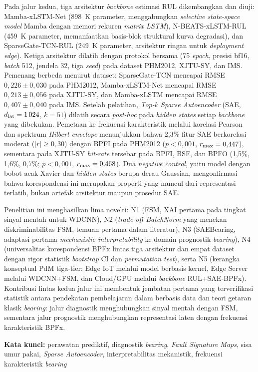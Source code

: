 \begin{abstractid}
Pada jalur kedua, tiga arsitektur \emph{backbone} estimasi RUL
dikembangkan dan diuji: Mamba-xLSTM-Net (898~K parameter, menggabungkan
\emph{selective state-space model} Mamba dengan memori rekuren
\emph{matrix LSTM}), N-BEATS-xLSTM-RUL (459~K parameter, memanfaatkan
basis-blok struktural kurva degradasi), dan SparseGate-TCN-RUL (249~K
parameter, arsitektur ringan untuk \emph{deployment edge}).
Ketiga arsitektur dilatih dengan protokol bersama (75 \emph{epoch},
presisi bf16, \emph{batch} 512, jendela 32, tiga \emph{seed}) pada
dataset PHM2012, XJTU-SY, dan IMS.
Pemenang berbeda menurut dataset: SparseGate-TCN mencapai RMSE
$0{,}226 \pm 0{,}030$ pada PHM2012, {\color{blue}Mamba-xLSTM-Net mencapai RMSE
$0{,}213 \pm 0{,}056$ pada XJTU-SY}, dan Mamba-xLSTM mencapai RMSE
$0{,}407 \pm 0{,}040$ pada IMS.
Setelah pelatihan, \emph{Top-$k$ Sparse Autoencoder} (SAE,
$d_{\rm lat} = 1\,024$, $k = 51$) dilatih secara \emph{post-hoc} pada
\emph{hidden states} setiap \emph{backbone} yang dibekukan.
Pemetaan ke frekuensi karakteristik melalui korelasi Pearson dan
spektrum \emph{Hilbert envelope} menunjukkan bahwa 2,3\% fitur SAE
berkorelasi moderat ($|r| \geq 0{,}30$) dengan BPFI pada PHM2012
($p < 0{,}001$, $r_{\rm max} = 0{,}447$), {\color{blue}sementara pada XJTU-SY \emph{hit-rate} tersebar pada BPFI, BSF, dan BPFO
(1{,}5\%, 1{,}6\%, 0{,}7\%; $p < 0{,}001$, $r_{\rm max} = 0{,}468$).}
Dua \emph{negative control}, yaitu model dengan bobot acak Xavier dan
\emph{hidden states} berupa derau Gaussian, mengonfirmasi bahwa
korespondensi ini merupakan properti yang muncul dari representasi
terlatih, bukan artefak arsitektur maupun prosedur SAE.

Penelitian ini menghasilkan lima novelti: N1 (FSM, XAI pertama pada
tingkat sinyal mentah untuk WDCNN), N2 (\emph{trade-off BatchNorm}
yang menekan diskriminabilitas FSM, temuan pertama dalam literatur), N3
(SAEBearing, adaptasi pertama \emph{mechanistic interpretability} ke
domain prognostik \emph{bearing}), N4 (universalitas korespondensi BPFx lintas
tiga arsitektur dan empat dataset dengan rigor statistik \emph{bootstrap}
CI dan \emph{permutation test}), serta N5 (kerangka konseptual PdM
tiga-tier: Edge IoT melalui model berbasis kernel, Edge Server melalui
WDCNN+FSM, dan Cloud/GPU melalui \emph{backbone} RUL+SAE-BPFx).
Kontribusi lintas kedua jalur ini membentuk jembatan pertama yang
terverifikasi statistik antara pendekatan pembelajaran dalam berbasis data
dan teori getaran klasik \emph{bearing}: jalur diagnostik menghubungkan sinyal
mentah dengan FSM, sementara jalur prognostik menghubungkan representasi
laten dengan frekuensi karakteristik BPFx.

\bigskip\noindent
\textbf{Kata kunci:} perawatan prediktif, diagnostik \emph{bearing},
\emph{Fault Signature Maps}, sisa umur pakai, \emph{Sparse Autoencoder},
interpretabilitas mekanistik, frekuensi karakteristik \emph{bearing}

\end{abstractid}

